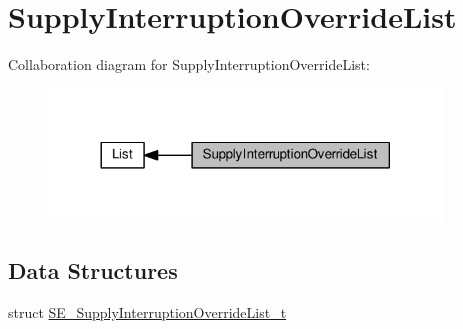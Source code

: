 \hypertarget{group__SupplyInterruptionOverrideList}{}\section{Supply\+Interruption\+Override\+List}
\label{group__SupplyInterruptionOverrideList}
Collaboration diagram for Supply\+Interruption\+Override\+List\+:\nopagebreak
\begin{figure}[H]
\begin{center}
\leavevmode
\includegraphics[width=296pt]{group__SupplyInterruptionOverrideList}
\end{center}
\end{figure}
\subsection*{Data Structures}
\begin{DoxyCompactItemize}
\item 
struct \hyperlink{structSE__SupplyInterruptionOverrideList__t}{S\+E\+\_\+\+Supply\+Interruption\+Override\+List\+\_\+t}
\end{DoxyCompactItemize}
